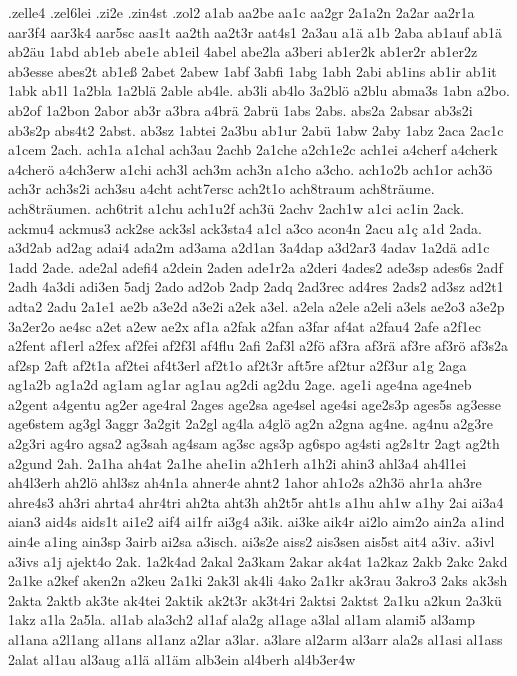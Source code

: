{.zelle4
.zel6lei
.zi2e
.zin4st
.zol2
a1ab
aa2be
aa1c
aa2gr
2a1a2n
2a2ar
aa2r1a
aar3f4
aar3k4
aar5sc
aas1t
aa2th
aa2t3r
aat4s1
2a3au
a1ä
a1b
2aba
ab1auf
ab1ä
ab2äu
1abd
ab1eb
abe1e
ab1eil
4abel
abe2la
a3beri
ab1er2k
ab1er2r
ab1er2z
ab3esse
abes2t
ab1eß
2abet
2abew
1abf
3abfi
1abg
1abh
2abi
ab1ins
ab1ir
ab1it
1abk
ab1l
1a2bla
1a2blä
2able
ab4le.
ab3li
ab4lo
3a2blö
a2blu
abma3s
1abn
a2bo.
ab2of
1a2bon
2abor
ab3r
a3bra
a4brä
2abrü
1abs
2abs.
abs2a
2absar
ab3s2i
ab3s2p
abs4t2
2abst.
ab3sz
1abtei
2a3bu
ab1ur
2abü
1abw
2aby
1abz
2aca
2ac1c
a1cem
2ach.
ach1a
a1chal
ach3au
2achb
2a1che
a2ch1e2c
ach1ei
a4cherf
a4cherk
a4cherö
a4ch3erw
a1chi
ach3l
ach3m
ach3n
a1cho
a3cho.
ach1o2b
ach1or
ach3ö
ach3r
ach3s2i
ach3su
a4cht
acht7ersc
ach2t1o
ach8traum
ach8träume.
ach8träumen.
ach6trit
a1chu
ach1u2f
ach3ü
2achv
2ach1w
a1ci
ac1in
2ack.
ackmu4
ackmus3
ack2se
ack3sl
ack3sta4
a1cl
a3co
acon4n
2acu
a1ç
a1d
2ada.
a3d2ab
ad2ag
adai4
ada2m
ad3ama
a2d1an
3a4dap
a3d2ar3
4adav
1a2dä
ad1c
1add
2ade.
ade2al
adefi4
a2dein
2aden
ade1r2a
a2deri
4ades2
ade3sp
ades6s
2adf
2adh
4a3di
adi3en
5adj
2ado
ad2ob
2adp
2adq
2ad3rec
ad4res
2ads2
ad3sz
ad2t1
adta2
2adu
2a1e1
ae2b
a3e2d
a3e2i
a2ek
a3el.
a2ela
a2ele
a2eli
a3els
ae2o3
a3e2p
3a2er2o
ae4sc
a2et
a2ew
ae2x
af1a
a2fak
a2fan
a3far
af4at
a2fau4
2afe
a2f1ec
a2fent
af1erl
a2fex
af2fei
af2f3l
af4flu
2afi
2af3l
a2fö
af3ra
af3rä
af3re
af3rö
af3s2a
af2sp
2aft
af2t1a
af2tei
af4t3erl
af2t1o
af2t3r
aft5re
af2tur
a2f3ur
a1g
2aga
ag1a2b
ag1a2d
ag1am
ag1ar
ag1au
ag2di
ag2du
2age.
age1i
age4na
age4neb
a2gent
a4gentu
ag2er
age4ral
2ages
age2sa
age4sel
age4si
age2s3p
ages5s
ag3esse
age6stem
ag3gl
3aggr
3a2git
2a2gl
ag4la
a4glö
ag2n
a2gna
ag4ne.
ag4nu
a2g3re
a2g3ri
ag4ro
agsa2
ag3sah
ag4sam
ag3sc
ags3p
ag6spo
ag4sti
ag2s1tr
2agt
ag2th
a2gund
2ah.
2a1ha
ah4at
2a1he
ahe1in
a2h1erh
a1h2i
ahin3
ahl3a4
ah4l1ei
ah4l3erh
ah2lö
ahl3sz
ah4n1a
ahner4e
ahnt2
1ahor
ah1o2s
a2h3ö
ahr1a
ah3re
ahre4s3
ah3ri
ahrta4
ahr4tri
ah2ta
aht3h
ah2t5r
aht1s
a1hu
ah1w
a1hy
2ai
ai3a4
aian3
aid4s
aids1t
ai1e2
aif4
ai1fr
ai3g4
a3ik.
ai3ke
aik4r
ai2lo
aim2o
ain2a
a1ind
ain4e
a1ing
ain3sp
3airb
ai2sa
a3isch.
ai3s2e
aiss2
ais3sen
ais5st
ait4
a3iv.
a3ivl
a3ivs
a1j
ajekt4o
2ak.
1a2k4ad
2akal
2a3kam
2akar
ak4at
1a2kaz
2akb
2akc
2akd
2a1ke
a2kef
aken2n
a2keu
2a1ki
2ak3l
ak4li
4ako
2a1kr
ak3rau
3akro3
2aks
ak3sh
2akta
2aktb
ak3te
ak4tei
2aktik
ak2t3r
ak3t4ri
2aktsi
2aktst
2a1ku
a2kun
2a3kü
1akz
a1la
2a5la.
al1ab
ala3ch2
al1af
ala2g
al1age
a3lal
al1am
alami5
al3amp
al1ana
a2l1ang
al1ans
al1anz
a2lar
a3lar.
a3lare
al2arm
al3arr
ala2s
al1asi
al1ass
2alat
al1au
al3aug
a1lä
al1äm
alb3ein
al4berh
al4b3er4w
}
